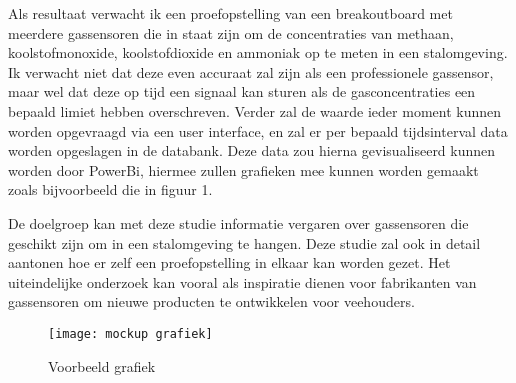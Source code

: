 Als resultaat verwacht ik een proefopstelling van een breakoutboard met meerdere gassensoren die in staat zijn om de concentraties van methaan, koolstofmonoxide, koolstofdioxide en ammoniak op te meten in een stalomgeving. Ik verwacht niet dat deze even accuraat zal zijn als een professionele gassensor, maar wel dat deze op tijd een signaal kan sturen als de gasconcentraties een bepaald limiet hebben overschreven. Verder zal de waarde ieder moment kunnen worden opgevraagd via een user interface, en zal er per bepaald tijdsinterval data worden opgeslagen in de databank. Deze data zou hierna gevisualiseerd kunnen worden door PowerBi, hiermee zullen grafieken mee kunnen worden gemaakt zoals bijvoorbeeld die in figuur 1.

De doelgroep kan met deze studie informatie vergaren over gassensoren die geschikt zijn om in een stalomgeving te hangen. Deze studie zal ook in detail aantonen hoe er zelf een proefopstelling in elkaar kan worden gezet. Het uiteindelijke onderzoek kan vooral als inspiratie dienen voor fabrikanten van gassensoren om nieuwe producten te ontwikkelen voor veehouders.


\begin{figure}
    \texttt{[image: mockup grafiek]}
    \caption{Voorbeeld grafiek}
\end{figure}






